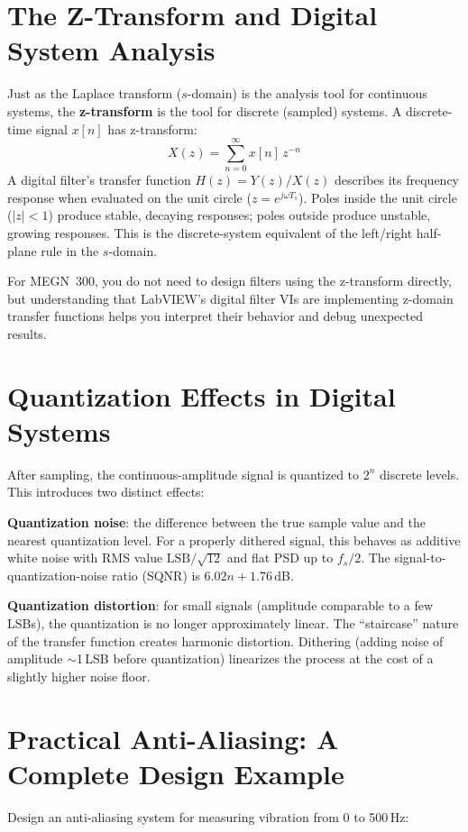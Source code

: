 \documentclass[11pt,letterpaper,twoside,openany]{book}
\begin{document}
\section{The Z-Transform and Digital System Analysis}
Just as the Laplace transform ($s$-domain) is the analysis tool for continuous systems, the \textbf{z-transform} is the tool for discrete (sampled) systems. A discrete-time signal $x[n]$ has z-transform:
\begin{equation}
X(z) = \sum_{n=0}^{\infty} x[n] \, z^{-n}
\end{equation}
A digital filter's transfer function $H(z) = Y(z)/X(z)$ describes its frequency response when evaluated on the unit circle ($z = e^{j\omega T_s}$). Poles inside the unit circle ($|z| < 1$) produce stable, decaying responses; poles outside produce unstable, growing responses. This is the discrete-system equivalent of the left/right half-plane rule in the $s$-domain.

For MEGN~300, you do not need to design filters using the z-transform directly, but understanding that LabVIEW's digital filter VIs are implementing z-domain transfer functions helps you interpret their behavior and debug unexpected results.

\section{Quantization Effects in Digital Systems}
After sampling, the continuous-amplitude signal is quantized to $2^n$ discrete levels. This introduces two distinct effects:

\textbf{Quantization noise}: the difference between the true sample value and the nearest quantization level. For a properly dithered signal, this behaves as additive white noise with RMS value $\text{LSB}/\sqrt{12}$ and flat PSD up to $f_s/2$. The signal-to-quantization-noise ratio (SQNR) is $6.02n + 1.76$\,dB.

\textbf{Quantization distortion}: for small signals (amplitude comparable to a few LSBs), the quantization is no longer approximately linear. The ``staircase'' nature of the transfer function creates harmonic distortion. Dithering (adding noise of amplitude $\sim$1\,LSB before quantization) linearizes the process at the cost of a slightly higher noise floor.

\section{Practical Anti-Aliasing: A Complete Design Example}
Design an anti-aliasing system for measuring vibration from 0 to 500\,Hz:
\end{document}
